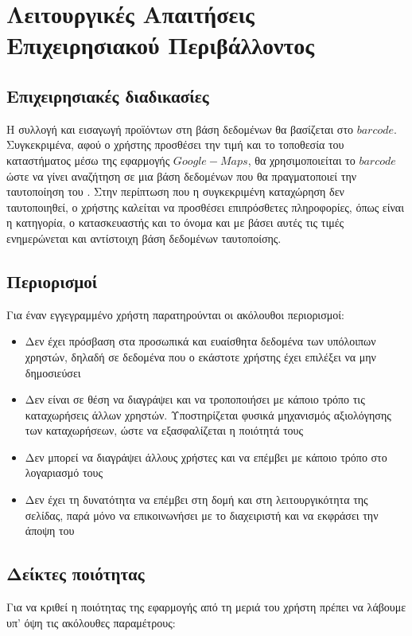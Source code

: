 \documentclass[12pt]{article}
\begin{document}
\section{Λειτουργικές Απαιτήσεις Επιχειρησιακού Περιβάλλοντος}

\subsection{Επιχειρησιακές διαδικασίες}

Η συλλογή και εισαγωγή προϊόντων στη βάση δεδομένων θα βασίζεται στο $barcode$.  Συγκεκριμένα, αφού ο χρήστης προσθέσει την τιμή και το τοποθεσία του καταστήματος μέσω της εφαρμογής $Google-Maps$, θα χρησιμοποιείται το $barcode$ ώστε να γίνει αναζήτηση σε μια βάση δεδομένων που θα πραγματοποιεί την ταυτοποίηση του . Στην περίπτωση που η συγκεκριμένη καταχώρηση δεν ταυτοποιηθεί, ο χρήστης καλείται να προσθέσει επιπρόσθετες πληροφορίες, όπως είναι η κατηγορία, ο κατασκευαστής και το όνομα και με βάσει αυτές τις τιμές ενημερώνεται και αντίστοιχη βάση δεδομένων ταυτοποίσης.

\subsection{Περιορισμοί}

Για έναν εγγεγραμμένο χρήστη παρατηρούνται οι ακόλουθοι περιορισμοί:
\begin{itemize}
	\item Δεν έχει πρόσβαση στα προσωπικά και ευαίσθητα δεδομένα των υπόλοιπων χρηστών, δηλαδή σε δεδομένα που ο εκάστοτε χρήστης έχει επιλέξει να μην δημοσιεύσει
	\item Δεν είναι σε θέση να διαγράψει και να τροποποιήσει με κάποιο τρόπο τις καταχωρήσεις άλλων χρηστών. Υποστηρίζεται φυσικά μηχανισμός αξιολόγησης των καταχωρήσεων, ώστε να εξασφαλίζεται η ποιότητά τους
\item Δεν μπορεί να διαγράψει άλλους χρήστες και να επέμβει με κάποιο τρόπο στο λογαριασμό τους
\item Δεν έχει τη δυνατότητα να επέμβει στη δομή και στη λειτουργικότητα της σελίδας, παρά μόνο να επικοινωνήσει με το διαχειριστή και να εκφράσει την άποψη του
\end{itemize}


\subsection{Δείκτες ποιότητας}

Για να κριθεί η ποιότητας της εφαρμογής από τη μεριά του χρήστη πρέπει να λάβουμε υπ' όψη τις ακόλουθες παραμέτρους:
\end{document}
